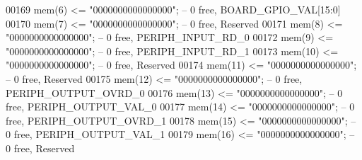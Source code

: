 \begin{DoxyCode}
00169             \textcolor{vhdlchar}{mem}\textcolor{vhdlchar}{(}\textcolor{vhdllogic}{}\textcolor{vhdllogic}{6}\textcolor{vhdlchar}{)}  \textcolor{vhdlchar}{<=} \textcolor{vhdllogic}{"0000000000000000"};\textcolor{keyword}{ --  0 free, BOARD\_GPIO\_VAL[15:0]}
00170             \textcolor{vhdlchar}{mem}\textcolor{vhdlchar}{(}\textcolor{vhdllogic}{}\textcolor{vhdllogic}{7}\textcolor{vhdlchar}{)}  \textcolor{vhdlchar}{<=} \textcolor{vhdllogic}{"0000000000000000"};\textcolor{keyword}{ --  0 free, Reserved}
00171             \textcolor{vhdlchar}{mem}\textcolor{vhdlchar}{(}\textcolor{vhdllogic}{}\textcolor{vhdllogic}{8}\textcolor{vhdlchar}{)}  \textcolor{vhdlchar}{<=} \textcolor{vhdllogic}{"0000000000000000"};\textcolor{keyword}{ --  0 free, PERIPH\_INPUT\_RD\_0}
00172             \textcolor{vhdlchar}{mem}\textcolor{vhdlchar}{(}\textcolor{vhdllogic}{}\textcolor{vhdllogic}{9}\textcolor{vhdlchar}{)}  \textcolor{vhdlchar}{<=} \textcolor{vhdllogic}{"0000000000000000"};\textcolor{keyword}{ --  0 free, PERIPH\_INPUT\_RD\_1}
00173             \textcolor{vhdlchar}{mem}\textcolor{vhdlchar}{(}\textcolor{vhdllogic}{}\textcolor{vhdllogic}{10}\textcolor{vhdlchar}{)} \textcolor{vhdlchar}{<=} \textcolor{vhdllogic}{"0000000000000000"};\textcolor{keyword}{ --  0 free, Reserved}
00174             \textcolor{vhdlchar}{mem}\textcolor{vhdlchar}{(}\textcolor{vhdllogic}{}\textcolor{vhdllogic}{11}\textcolor{vhdlchar}{)} \textcolor{vhdlchar}{<=} \textcolor{vhdllogic}{"0000000000000000"};\textcolor{keyword}{ --  0 free, Reserved         }
00175             \textcolor{vhdlchar}{mem}\textcolor{vhdlchar}{(}\textcolor{vhdllogic}{}\textcolor{vhdllogic}{12}\textcolor{vhdlchar}{)} \textcolor{vhdlchar}{<=} \textcolor{vhdllogic}{"0000000000000000"};\textcolor{keyword}{ --  0 free, PERIPH\_OUTPUT\_OVRD\_0}
00176             \textcolor{vhdlchar}{mem}\textcolor{vhdlchar}{(}\textcolor{vhdllogic}{}\textcolor{vhdllogic}{13}\textcolor{vhdlchar}{)} \textcolor{vhdlchar}{<=} \textcolor{vhdllogic}{"0000000000000000"};\textcolor{keyword}{ --  0 free, PERIPH\_OUTPUT\_VAL\_0}
00177             \textcolor{vhdlchar}{mem}\textcolor{vhdlchar}{(}\textcolor{vhdllogic}{}\textcolor{vhdllogic}{14}\textcolor{vhdlchar}{)} \textcolor{vhdlchar}{<=} \textcolor{vhdllogic}{"0000000000000000"};\textcolor{keyword}{ --  0 free, PERIPH\_OUTPUT\_OVRD\_1}
00178             \textcolor{vhdlchar}{mem}\textcolor{vhdlchar}{(}\textcolor{vhdllogic}{}\textcolor{vhdllogic}{15}\textcolor{vhdlchar}{)} \textcolor{vhdlchar}{<=} \textcolor{vhdllogic}{"0000000000000000"};\textcolor{keyword}{ --  0 free, PERIPH\_OUTPUT\_VAL\_1}
00179             \textcolor{vhdlchar}{mem}\textcolor{vhdlchar}{(}\textcolor{vhdllogic}{}\textcolor{vhdllogic}{16}\textcolor{vhdlchar}{)} \textcolor{vhdlchar}{<=} \textcolor{vhdllogic}{"0000000000000000"};\textcolor{keyword}{ --  0 free, Reserved}

\end{DoxyCode}
